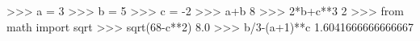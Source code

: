 >>> a = 3
>>> b = 5
>>> c = -2
>>> a+b
8
>>> 2*b+c**3
2
>>> from math import sqrt
>>> sqrt(68-c**2)
8.0
>>> b/3-(a+1)**c
1.6041666666666667